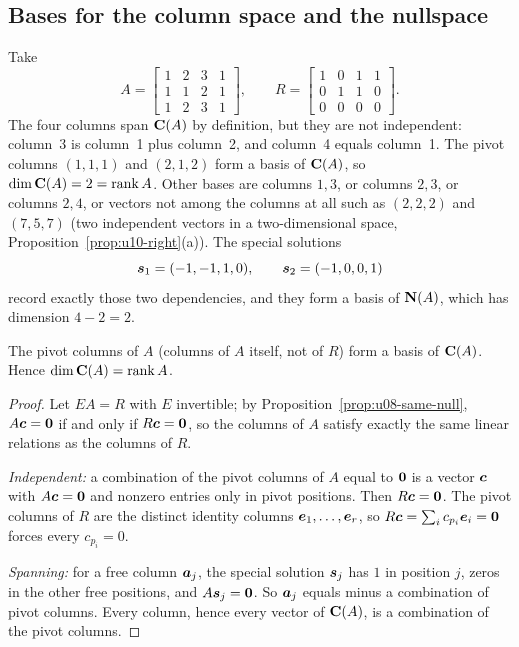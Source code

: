 \subsection{Bases for the column space and the nullspace}

\begin{example}\label{ex:u10-CN}
Take
\[
A=\begin{bmatrix}1&2&3&1\\1&1&2&1\\1&2&3&1\end{bmatrix},\qquad
R=\begin{bmatrix}1&0&1&1\\0&1&1&0\\0&0&0&0\end{bmatrix}.
\]
The four columns span $\mathbf{C}(A)$ by definition, but they are not independent: column~3 is
column~1 plus column~2, and column~4 equals column~1. The pivot columns $(1,1,1)$ and $(2,1,2)$
form a basis of $\mathbf{C}(A)$, so $\dim\mathbf{C}(A)=2=\operatorname{rank} A$. Other bases are columns $1,3$, or columns
$2,3$, or columns $2,4$, or vectors not among the columns at all such as $(2,2,2)$ and $(7,5,7)$
(two independent vectors in a two-dimensional space, Proposition~\ref{prop:u10-right}(a)). The
special solutions
\[
\boldsymbol{s}_1=(-1,-1,1,0),\qquad \boldsymbol{s}_2=(-1,0,0,1)
\]
record exactly those two dependencies, and they form a basis of $\mathbf{N}(A)$, which has dimension
$4-2=2$.
\end{example}

\begin{theorem}\label{thm:u10-col}
The pivot columns of $A$ (columns of $A$ itself, not of $R$) form a basis of $\mathbf{C}(A)$. Hence
$\dim\mathbf{C}(A)=\operatorname{rank} A$.
\end{theorem}
\begin{proof}
Let $EA=R$ with $E$ invertible; by Proposition~\ref{prop:u08-same-null}, $A\boldsymbol{c}=\boldsymbol{0}$ if and
only if $R\boldsymbol{c}=\boldsymbol{0}$, so the columns of $A$ satisfy exactly the same linear relations as the
columns of $R$.

\emph{Independent:} a combination of the pivot columns of $A$ equal to $\boldsymbol{0}$ is a vector
$\boldsymbol{c}$ with $A\boldsymbol{c}=\boldsymbol{0}$ and nonzero entries only in pivot positions. Then $R\boldsymbol{c}=\boldsymbol{0}$.
The pivot columns of $R$ are the distinct identity columns $\boldsymbol{e}_1,\dots,\boldsymbol{e}_r$, so
$R\boldsymbol{c}=\sum_i c_{p_i}\boldsymbol{e}_i=\boldsymbol{0}$ forces every $c_{p_i}=0$.

\emph{Spanning:} for a free column $\boldsymbol{a}_j$, the special solution $\boldsymbol{s}_j$ has $1$ in position
$j$, zeros in the other free positions, and $A\boldsymbol{s}_j=\boldsymbol{0}$. So $\boldsymbol{a}_j$ equals minus a
combination of pivot columns. Every column, hence every vector of $\mathbf{C}(A)$, is a combination of the
pivot columns.
\end{proof}

